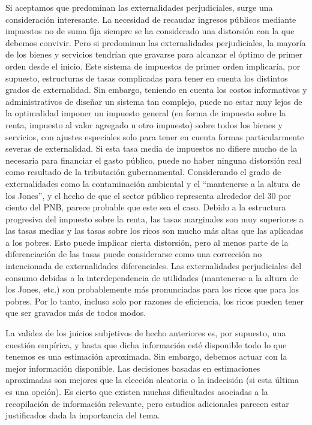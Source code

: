 \documentclass[10pt,a4paper]{article}
\begin{document}
Si aceptamos que predominan las externalidades perjudiciales, surge una consideración interesante. La necesidad de recaudar ingresos públicos mediante impuestos no de suma fija siempre se ha considerado una distorsión con la que debemos convivir. Pero si predominan las externalidades perjudiciales, la mayoría de los bienes y servicios tendrían que gravarse para alcanzar el óptimo de primer orden desde el inicio. Este sistema de impuestos de primer orden implicaría, por supuesto, estructuras de tasas complicadas para tener en cuenta los distintos grados de externalidad. Sin embargo, teniendo en cuenta los costos informativos y administrativos de diseñar un sistema tan complejo, puede no estar muy lejos de la optimalidad imponer un impuesto general (en forma de impuesto sobre la renta, impuesto al valor agregado u otro impuesto) sobre todos los bienes y servicios, con ajustes especiales solo para tener en cuenta formas particularmente severas de externalidad. Si esta tasa media de impuestos no difiere mucho de la necesaria para financiar el gasto público, puede no haber ninguna distorsión real como resultado de la tributación gubernamental. Considerando el grado de externalidades como la contaminación ambiental y el “mantenerse a la altura de los Jones”, y el hecho de que el sector público representa alrededor del 30 por ciento del PNB, parece probable que este sea el caso. Debido a la estructura progresiva del impuesto sobre la renta, las tasas marginales son muy superiores a las tasas medias y las tasas sobre los ricos son mucho más altas que las aplicadas a los pobres. Esto puede implicar cierta distorsión, pero al menos parte de la diferenciación de las tasas puede considerarse como una corrección no intencionada de externalidades diferenciales. Las externalidades perjudiciales del consumo debidas a la interdependencia de utilidades (mantenerse a la altura de los Jones, etc.) son probablemente más pronunciadas para los ricos que para los pobres. Por lo tanto, incluso solo por razones de eficiencia, los ricos pueden tener que ser gravados más de todos modos.

La validez de los juicios subjetivos de hecho anteriores es, por supuesto, una cuestión empírica, y hasta que dicha información esté disponible todo lo que tenemos es una estimación aproximada. Sin embargo, debemos actuar con la mejor información disponible. Las decisiones basadas en estimaciones aproximadas son mejores que la elección aleatoria o la indecisión (si esta última es una opción). Es cierto que existen muchas dificultades asociadas a la recopilación de información relevante, pero estudios adicionales parecen estar justificados dada la importancia del tema.
\end{document}

